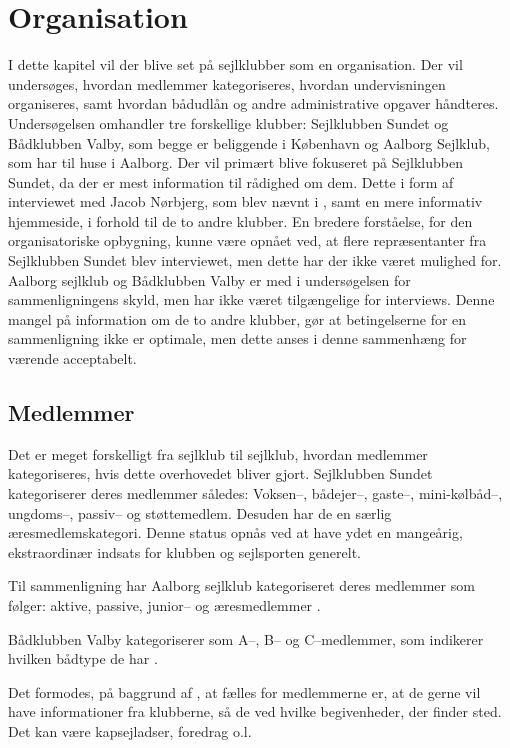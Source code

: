 \chapter{Organisation}\label{chap:organisation}

I dette kapitel vil der blive set på sejlklubber som en organisation.
Der vil undersøges, hvordan medlemmer kategoriseres, hvordan undervisningen organiseres, samt hvordan bådudlån og andre administrative opgaver håndteres. 
Undersøgelsen omhandler tre forskellige klubber: Sejlklubben Sundet og Bådklubben Valby, som begge er beliggende i København og Aalborg Sejlklub, som har til huse i Aalborg. 
Der vil primært blive fokuseret på Sejlklubben Sundet, da der er mest information til rådighed om dem.
Dette i form af interviewet med Jacob Nørbjerg, som blev nævnt i , samt en mere informativ hjemmeside, i forhold til de to andre klubber. 
En bredere forståelse, for den organisatoriske opbygning, kunne være opnået ved, at flere repræsentanter fra Sejlklubben Sundet blev interviewet, men dette har der ikke været mulighed for.
Aalborg sejlklub og Bådklubben Valby er med i undersøgelsen for sammenligningens skyld, men har ikke været tilgængelige for interviews. 
Denne mangel på information om de to andre klubber, gør at betingelserne for en sammenligning ikke er optimale, men dette anses i denne sammenhæng for værende acceptabelt.

\section{Medlemmer}\label{sec:organisation-medlemmer}

Det er meget forskelligt fra sejlklub til sejlklub, hvordan medlemmer kategoriseres, hvis dette overhovedet bliver gjort.
Sejlklubben Sundet kategoriserer deres medlemmer således: Voksen--, bådejer--, gaste--, mini-kølbåd--, ungdoms--, passiv-- og støttemedlem. 
Desuden har de en særlig æresmedlemskategori.
Denne status opnås ved at have ydet en mangeårig, ekstraordinær indsats for klubben og sejlsporten generelt.\citep{sundet_vedtaegter}

Til sammenligning har Aalborg sejlklub kategoriseret deres medlemmer som følger: aktive, passive, junior-- og æresmedlemmer \citep{aalborg_sejlklub_vedtaegter}.

Bådklubben Valby kategoriserer som A--, B-- og C--medlemmer, som indikerer hvilken bådtype de har \citep{badklubben_valby_love}.

Det formodes, på baggrund af , at fælles for medlemmerne er, at de gerne vil have informationer fra klubberne, så de ved hvilke begivenheder, der finder sted. 
Det kan være kapsejladser, foredrag o.l.


